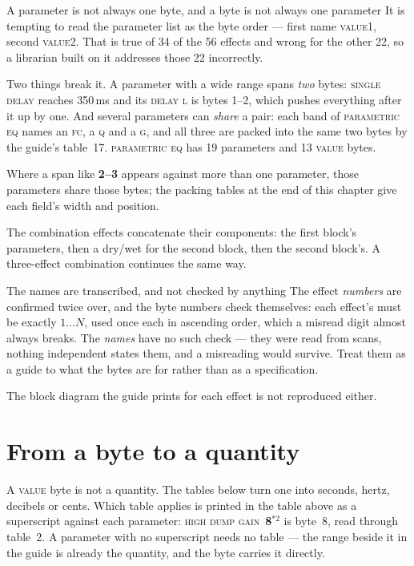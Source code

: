 \begin{caution}{A parameter is not always one byte, and a byte is not always one parameter}
It is tempting to read the parameter list as the byte order --- first name
\textsc{value1}, second \textsc{value2}. That is true of 34 of the 56 effects and wrong
for the other 22, so a librarian built on it addresses those 22 incorrectly.

Two things break it. A parameter with a wide range spans \emph{two} bytes: \textsc{single
delay} reaches 350\,ms and its \textsc{delay l} is bytes 1--2, which pushes everything
after it up by one. And several parameters can \emph{share} a pair: each band of
\textsc{parametric eq} names an \textsc{fc}, a \textsc{q} and a \textsc{g}, and all
three are packed into the same two bytes by the guide's table~17. \textsc{parametric eq}
has 19 parameters and 13 \textsc{value} bytes.

Where a span like \textbf{2--3} appears against more than one parameter, those parameters
share those bytes; the packing tables at the end of this chapter give each field's width
and position.
\end{caution}

The combination effects concatenate their components: the first block's parameters, then
a dry/wet for the second block, then the second block's. A three-effect combination
continues the same way.

\begin{caution}{The names are transcribed, and not checked by anything}
The effect \emph{numbers} are confirmed twice over, and the byte numbers check themselves:
each effect's must be exactly $1\ldots N$, used once each in ascending order, which a
misread digit almost always breaks. The \emph{names} have no such check --- they were read
from scans, nothing independent states them, and a misreading would survive. Treat them as
a guide to what the bytes are for rather than as a specification.

The block diagram the guide prints for each effect is not reproduced either.
\end{caution}



\section{From a byte to a quantity}\label{sec:conversions}
A \textsc{value} byte is not a quantity. The tables below turn one into seconds, hertz,
decibels or cents. Which table applies is printed in the table above as a superscript
against each parameter: \textsc{high dump gain}~\textbf{8}$^{*2}$ is byte~8, read through
table~2. A parameter with no superscript needs no table --- the range beside it in the
guide is already the quantity, and the byte carries it directly.

